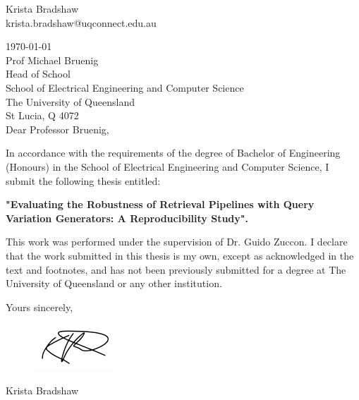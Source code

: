 \begin{flushright}
	Krista Bradshaw\\
    krista.bradshaw@uqconnect.edu.au
\end{flushright}
\today\\
Prof Michael Bruenig\\
Head of School\\
School of Electrical Engineering and Computer Science\\
The University of Queensland\\
St Lucia, Q 4072\\
\bigskip\bigskip
Dear Professor Bruenig,

In accordance with the requirements of the degree of Bachelor of
Engineering (Honours) in the School of Electrical Engineering and Computer Science,
I submit the following thesis entitled:

\begin{center}
    \textbf{"Evaluating the Robustness of Retrieval Pipelines with Query \\Variation Generators: A Reproducibility Study".} 
\end{center}

This work was performed under the supervision of Dr. Guido Zuccon. I declare that the work submitted in this thesis is my own, except as acknowledged in the text and footnotes, and has not been previously submitted for a degree at The University of Queensland or any other institution.
\bigskip\bigskip
\begin{flushright}  
    Yours sincerely,\\ 
    \bigskip\bigskip
    \begin{figure}[h]
        \includegraphics[width=0.25\linewidth, right]{0FrontMatter/sig.png}
    \end{figure}
    Krista Bradshaw
\end{flushright}
